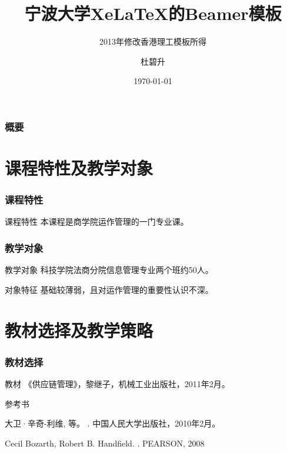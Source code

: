 \documentclass{beamer}
\title{宁波大学Xe\LaTeX 的Beamer模板}
\subtitle{2013年修改香港理工模板所得}
\author{杜碧升}
\institute{商学院\ 管理科学与工程系}
\date[2013年教师教学技能培训]{{\small \today}}
\begin{document}

\begin{frame}
  \titlepage
\end{frame}

\begin{frame}
  \frametitle{概要}
  \tableofcontents
\end{frame}


\section{课程特性及教学对象}

\begin{frame}
\frametitle{课程特性}

\begin{alertblock}{课程特性}
本课程是商学院运作管理的一门专业课。
\end{alertblock}


\end{frame}


\begin{frame}
\frametitle{教学对象}


\begin{block}{教学对象}
科技学院法商分院信息管理专业两个班约50人。
\end{block}
\pause
\begin{block}{对象特征}
基础较薄弱，且对运作管理的重要性认识不深。
\end{block} 

\end{frame}


\section{教材选择及教学策略}

\begin{frame}
\frametitle{教材选择}

\begin{block}{教材}
《供应链管理》，黎继子，机械工业出版社，2011年2月。
\end{block}

\begin{block}{参考书}
  \begin{thebibliography}{10}
    
  \beamertemplatebookbibitems

    大卫·辛奇-利维, 等。
    .
    \newblock 中国人民大学出版社，2010年2月。

    Cecil Bozarth, Robert B. Handfield.
    .
    \newblock PEARSON, 2008

  \end{thebibliography}

\end{block}

\end{frame}
\end{document}
